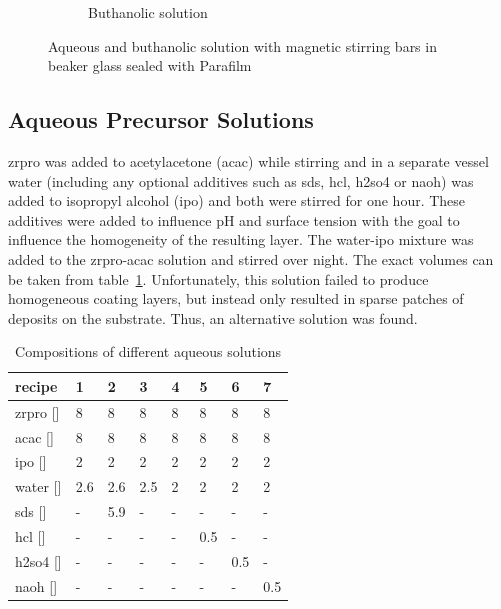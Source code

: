 \begin{figure}[htb]
\begin{subfigure}{0.49\textwidth}
		\label{fig:sol-bu}
		\caption{Buthanolic solution}
	\end{subfigure}
	\label{fig:sol}
	\caption{Aqueous and buthanolic solution with magnetic stirring bars in beaker glass sealed with Parafilm} 
\end{figure}
\fi

\subsection{Aqueous Precursor Solutions}
\label{sec:exp-sol-aq}
\gls{zrpro} was added to acetylacetone (\gls{acac}) while stirring and in a separate vessel \gls{water} 
(including any optional additives such as \gls{sds}, \gls{hcl}, \gls{h2so4} or \gls{naoh}) 
was added to isopropyl alcohol (\gls{ipo}) and both were stirred for one hour. 
These additives were added to influence pH and surface tension with the goal to influence the homogeneity of the resulting layer. %
The \gls{water}-\gls{ipo} mixture was added to the \gls{zrpro}-\gls{acac} solution and stirred over night. 
The exact volumes can be taken from table~\ref{tab:rec1}.
Unfortunately, this solution failed to produce homogeneous coating layers, but instead only resulted in sparse patches of deposits on the substrate.
Thus, an alternative solution was found.
\begin{table}[h]
	\centering
	\caption{Compositions of different aqueous solutions}
	\label{tab:rec1}
	\begin{tabular}{llllllll}
		\hline
		recipe				&1		&2		&3		&4		&5		&6		&7\\
		\hline
		\gls{zrpro} [\ml{}]	&8		&8		&8		&8		&8		&8		&8\\
		\gls{acac}  [\ml{}]	&8		&8		&8		&8		&8		&8		&8\\
		\gls{ipo}   [\ml{}]	&2		&2		&2		&2		&2		&2		&2\\
		\gls{water} [\ml{}]	&2.6	&2.6	&2.5	&2~		&2		&2		&2\\
		\gls{sds}   [\mg{}]	&-		&5.9	&-		&-		&-		&-		&-\\
		\gls{hcl}   [\ml{}]	&-		&-		&-		&-		&0.5	&-		&-\\
		\gls{h2so4} [\ml{}]	&-		&-		&-		&-		&-		&0.5	&-\\
		\gls{naoh}  [\ml{}] &-		&-		&-		&-		&-		&-		&0.5\\
		\hline
	\end{tabular}
\end{table}
%
